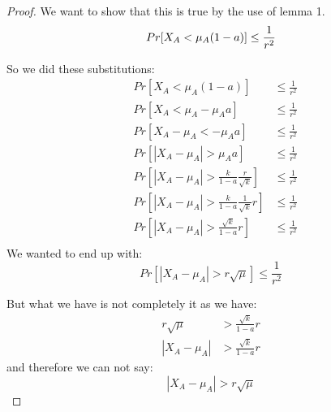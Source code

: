 \begin{proof}
    We want to show that this is true by the use of lemma 1.
    \begin{equation*}
        Pr[X_A < \mu_A(1-a)] \le \frac{1}{r^2}\\
    \end{equation*}

    So we did these substitutions:
    \begin{align*}
        &Pr[X_A < \mu_A(1-a)] &\le \frac{1}{r^2}\\
        &Pr[X_A < \mu_A - \mu_A a] &\le \frac{1}{r^2}\\
        &Pr[X_A - \mu_A < - \mu_A a] &\le \frac{1}{r^2}\\
        &Pr[|X_A - \mu_A| > \mu_A a] &\le \frac{1}{r^2}\\
        &Pr[|X_A - \mu_A| > \frac{k}{1-a} \frac{r}{\sqrt{k}}]   &\le \frac{1}{r^2}\\
        &Pr[|X_A - \mu_A| > \frac{k}{1-a} \frac{1}{\sqrt{k}} r] &\le \frac{1}{r^2}\\
        &Pr[|X_A - \mu_A| > \frac{\sqrt{k}}{1-a} r]&\le \frac{1}{r^2}\\
    \end{align*}
    We wanted to end up with:
    \begin{equation*}
        Pr[|X_A - \mu_A| > r \sqrt{\mu}] \le \frac{1}{r^2}
    \end{equation*}

    But what we have is not completely it as we have:
    \begin{align*}
        r \sqrt{\mu} &> \frac{\sqrt{k}}{1-a} r\\
        |X_A - \mu_A| &> \frac{\sqrt{k}}{1-a} r
    \end{align*}
    and therefore we can not say:
    \begin{equation*}
        |X_A - \mu_A| > r \sqrt{\mu}
    \end{equation*}


\end{proof}
